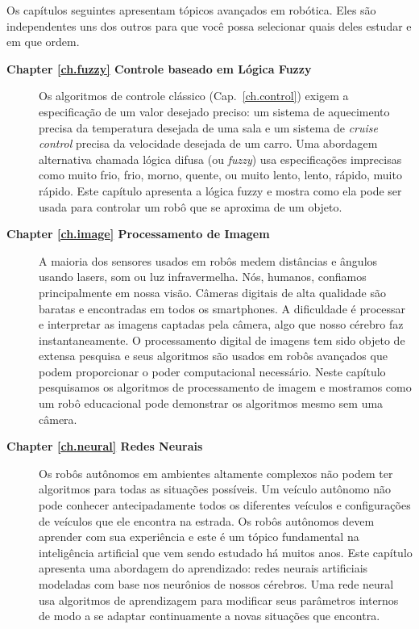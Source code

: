 \enlargethispage{\baselineskip}

Os capítulos seguintes apresentam tópicos avançados em robótica. Eles são independentes uns dos outros para que você possa selecionar quais deles estudar e em que ordem.
\begin{description}
\item [\textbf{Chapter \ref{ch.fuzzy} Controle baseado em Lógica Fuzzy}] Os algoritmos de controle clássico (Cap.~\ref{ch.control}) exigem a especificação de um valor desejado preciso: um sistema de aquecimento precisa da temperatura desejada de uma sala e um sistema de \emph{cruise control} precisa da velocidade desejada de um carro. Uma abordagem alternativa chamada lógica difusa (ou \emph{fuzzy}) usa especificações imprecisas como muito frio, frio, morno, quente, ou muito lento, lento, rápido, muito rápido. Este capítulo apresenta a lógica fuzzy e mostra como ela pode ser usada para controlar um robô que se aproxima de um objeto.

\item [\textbf{Chapter \ref{ch.image} Processamento de Imagem}] A maioria dos sensores usados em robôs medem distâncias e ângulos usando lasers, som ou luz infravermelha. Nós, humanos, confiamos principalmente em nossa visão. Câmeras digitais de alta qualidade são baratas e encontradas em todos os smartphones. A dificuldade é processar e interpretar as imagens captadas pela câmera, algo que nosso cérebro faz instantaneamente. O processamento digital de imagens tem sido objeto de extensa pesquisa e seus algoritmos são usados em robôs avançados que podem proporcionar o poder computacional necessário. Neste capítulo pesquisamos os algoritmos de processamento de imagem e mostramos como um robô educacional pode demonstrar os algoritmos mesmo sem uma câmera.

\item [\textbf{Chapter \ref{ch.neural} Redes Neurais}] Os robôs autônomos em ambientes altamente complexos não podem ter algoritmos para todas as situações possíveis. Um veículo autônomo não pode conhecer antecipadamente todos os diferentes veículos e configurações de veículos que ele encontra na estrada. Os robôs autônomos devem aprender com sua experiência e este é um tópico fundamental na inteligência artificial que vem sendo estudado há muitos anos. Este capítulo apresenta uma abordagem do aprendizado: redes neurais artificiais modeladas com base nos neurônios de nossos cérebros. Uma rede neural usa algoritmos de aprendizagem para modificar seus parâmetros internos de modo a se adaptar continuamente a novas situações que encontra.


\end{description}
